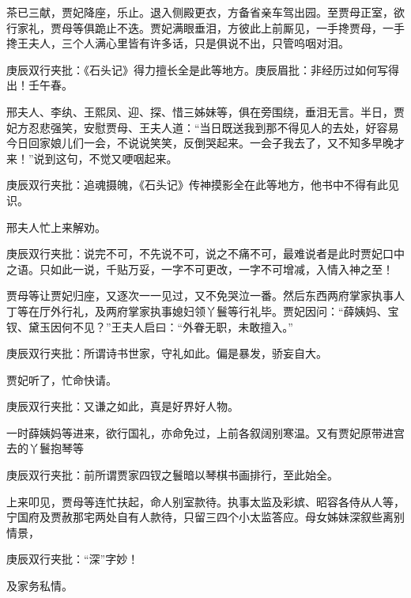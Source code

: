 \begin{parag}
    茶已三献，贾妃降座，乐止。退入侧殿更衣，方备省亲车驾出园。至贾母正室，欲行家礼，贾母等俱跪止不迭。贾妃满眼垂泪，方彼此上前厮见，一手搀贾母，一手搀王夫人，三个人满心里皆有许多话，只是俱说不出，只管呜咽对泪。\begin{note}庚辰双行夹批：《石头记》得力擅长全是此等地方。庚辰眉批：非经历过如何写得出！壬午春。\end{note}邢夫人、李纨、王熙凤、迎、探、惜三姊妹等，俱在旁围绕，垂泪无言。半日，贾妃方忍悲强笑，安慰贾母、王夫人道：“当日既送我到那不得见人的去处，好容易今日回家娘儿们一会，不说说笑笑，反倒哭起来。一会子我去了，又不知多早晚才来！”说到这句，不觉又哽咽起来。\begin{note}庚辰双行夹批：追魂摄魄，《石头记》传神摸影全在此等地方，他书中不得有此见识。\end{note}邢夫人忙上来解劝。\begin{note}庚辰双行夹批：说完不可，不先说不可，说之不痛不可，最难说者是此时贾妃口中之语。只如此一说，千贴万妥，一字不可更改，一字不可增减，入情入神之至！\end{note}贾母等让贾妃归座，又逐次一一见过，又不免哭泣一番。然后东西两府掌家执事人丁等在厅外行礼，及两府掌家执事媳妇领丫鬟等行礼毕。贾妃因问：“薛姨妈、宝钗、黛玉因何不见？”王夫人启曰：“外眷无职，未敢擅入。”\begin{note}庚辰双行夹批：所谓诗书世家，守礼如此。偏是暴发，骄妄自大。\end{note}贾妃听了，忙命快请。\begin{note}庚辰双行夹批：又谦之如此，真是好界好人物。\end{note}一时薛姨妈等进来，欲行国礼，亦命免过，上前各叙阔别寒温。又有贾妃原带进宫去的丫鬟抱琴等\begin{note}庚辰双行夹批：前所谓贾家四钗之鬟暗以琴棋书画排行，至此始全。\end{note}上来叩见，贾母等连忙扶起，命人别室款待。执事太监及彩嫔、昭容各侍从人等，宁国府及贾赦那宅两处自有人款待，只留三四个小太监答应。母女姊妹深叙些离别情景，\begin{note}庚辰双行夹批：“深”字妙！\end{note}及家务私情。
\end{parag}


